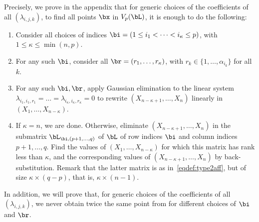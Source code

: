 \documentclass[12pt]{article}
\begin{document}
Precisely, we prove in the appendix that for generic choices of the
coefficients of all $(\lambda_{i,j,k})$, to find all points
$\bx$ in $V_p(\bL)$, it is enough to do the following:
\begin{enumerate}
\item Consider all choices of indices $\bi = (1\le i_1 < \dots <
  i_\kappa\le p)$, with $1 \leq \kappa \leq\min(n,p)$.
\item For any such $\bi$, consider all $\br = (r_1,\dots,r_\kappa)$,
  with $r_k \in \{1,\dots,\alpha_{i_k}\}$ for all $k$.
\item For any such $\bi,\br$, apply Gaussian elimination to the linear
  system
  $\lambda_{i_1,i_1,r_1}=\dots=\lambda_{i_\kappa,i_\kappa,r_\kappa}=0$
  to rewrite $(X_{n-\kappa+1}, \ldots, X_n)$  linearly in $(X_1,
  \ldots, X_{n-\kappa})$.
\item If $\kappa = n$, we are done. Otherwise, 
  eliminate $(X_{n-\kappa+1}, \ldots, X_n)$ in the submatrix
  $\bL_{\bi,(p+1, \ldots, q)}$ of $\bL$ of row indices $\bi$ and
  column indices $p+1,\dots,q$. Find the values of $(X_1, \ldots,
  X_{n-\kappa})$ for which this matrix has rank less than $\kappa$,
  and the corresponding values of $(X_{n-\kappa+1}, \ldots, X_n)$ by
  back-substitution. Remark that the latter matrix is as
  in~\eqref{eqdef:type2aff}, but of size $\kappa \times (q-p)$, that
  is, $ \kappa\times (n-1)$.
\end{enumerate}
In addition, we will prove that, for generic choices of the
coefficients of all $(\lambda_{i,j,k})$, we never obtain 
twice the same point from for different choices of $\bi$ and $\br$.
\end{document}
